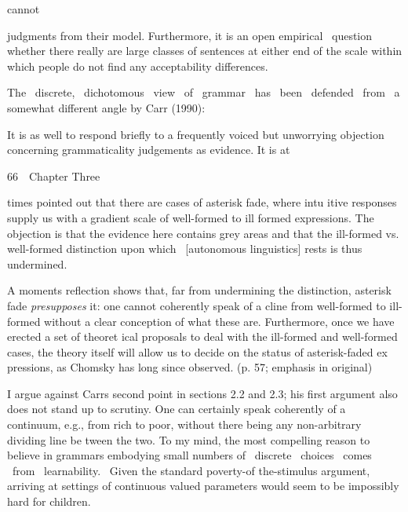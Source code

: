 \begin{styleStandard}
cannot
\end{styleStandard}


\begin{styleStandard}
judgments from their model. Furthermore, it is an open empirical \ question whether there really are large classes of sentences at either end of the scale within which people do not find any acceptability differences.
\end{styleStandard}


\begin{styleStandard}
The \ discrete, \ dichotomous \ view \ of \ grammar \ has \ been \ defended \ from \ a somewhat different angle by Carr (1990):
\end{styleStandard}


\begin{styleStandard}
It is as well to respond briefly to a frequently voiced but unworrying objection concerning grammaticality judgements as evidence. It is at
\end{styleStandard}


\clearpage\setcounter{page}{1}\begin{styleStandard}
66\ \ Chapter Three
\end{styleStandard}


\begin{styleStandard}
times pointed out that there are cases of {\textquotesingle}asterisk fade{\textquotesingle}, where intu\- itive responses supply us with a gradient scale of well-formed to ill\- formed expressions. The objection is that the evidence here contains grey areas and that the ill-formed vs. well-formed distinction upon which \ [autonomous linguistics] rests is thus undermined.
\end{styleStandard}


\begin{styleStandard}
A moment{\textquotesingle}s reflection shows that, far from undermining the distinction, asterisk fade \textit{presupposes}\textit{ }it: one cannot coherently speak of a cline from well-formed to ill-formed without a clear conception of what these are. Furthermore, once we have erected a set of theoret\- ical proposals to deal with the ill-formed and well-formed cases, the theory itself will allow us to decide on the status of asterisk-faded ex\- pressions, as Chomsky has long since observed. (p. 57; emphasis in original)
\end{styleStandard}


\begin{styleStandard}
I argue against Carr{\textquotesingle}s second point in sections 2.2 and 2.3; his first argument also does not stand up to scrutiny. One can certainly speak coherently of a continuum, e.g., from rich to poor, without there being any non-arbitrary dividing line be\- tween the two. To my mind, the most compelling reason to believe in grammars embodying small numbers of \ discrete \ choices \ comes \ from \ learnability. \ Given the standard poverty-of the-stimulus argument, arriving at settings of continuous\- valued parameters would seem to be impossibly hard for children.
\end{styleStandard}


